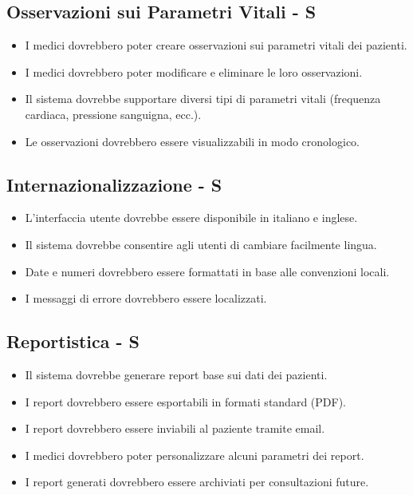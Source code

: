 \documentclass[12pt,a4paper,oneside]{report}
\begin{document}
\subsection{Osservazioni sui Parametri Vitali - S}

\begin{itemize}
    \item I medici dovrebbero poter creare osservazioni sui parametri vitali dei pazienti.
    \item I medici dovrebbero poter modificare e eliminare le loro osservazioni.
    \item Il sistema dovrebbe supportare diversi tipi di parametri vitali (frequenza cardiaca, pressione sanguigna, ecc.).
    \item Le osservazioni dovrebbero essere visualizzabili in modo cronologico.
\end{itemize}

\subsection{Internazionalizzazione - S}

\begin{itemize}
    \item L'interfaccia utente dovrebbe essere disponibile in italiano e inglese.
    \item Il sistema dovrebbe consentire agli utenti di cambiare facilmente lingua.
    \item Date e numeri dovrebbero essere formattati in base alle convenzioni locali.
    \item I messaggi di errore dovrebbero essere localizzati.
\end{itemize}

\subsection{Reportistica - S}

\begin{itemize}
    \item Il sistema dovrebbe generare report base sui dati dei pazienti.
    \item I report dovrebbero essere esportabili in formati standard (PDF).
    \item I report dovrebbero essere inviabili al paziente tramite email.
    \item I medici dovrebbero poter personalizzare alcuni parametri dei report.
    \item I report generati dovrebbero essere archiviati per consultazioni future.
\end{itemize}
\end{document}
